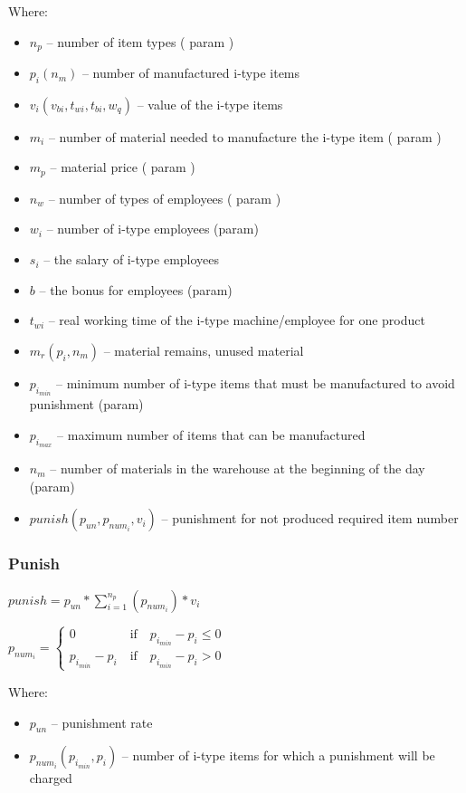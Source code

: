 \documentclass[a4paper]{article}
\begin{document}
Where:
\begin{itemize}
    \item $n_p$ -- number of item types ( param )
    \item $p_i (n_m)$ -- number of manufactured i-type items
    \item $v_i(v_{bi}, t_{wi},t_{bi},w_q)$ -- value of the i-type items
    \item $m_i$ -- number of material needed to manufacture the i-type item ( param )
    \item $m_p$ -- material price ( param )
    \item $n_w$ -- number of types of employees ( param )\item$w_i$ -- number of i-type employees (param)
    \item $s_i$ -- the salary of i-type employees\item$b$ -- the bonus for employees (param)
    \item $t_{wi}$ -- real working time of the i-type machine/employee for one product
    \item $m_r(p_i,n_m)$ -- material remains, unused material
    \item $p_{i_{min}}$ -- minimum number of i-type items that must be manufactured to avoid punishment (param) 
    \item $p_{i_{max}}$ -- maximum number of items that can be manufactured 
    \item $n_m$ -- number of materials in the warehouse at the beginning of the day (param)
    \item $punish(p_{un}, p_{num_i}, v_i)$ -- punishment for not produced required item number
\end{itemize}
\subsubsection{Punish}
$punish = p_{un}*\sum^{n_p}_{i=1}(p_{num_i})*v_i$

$p_{num_i}= \left\{\begin{matrix} 0  \;\quad\quad\quad\quad  \textrm{if} \quad  p_{i_{min}}-p_i \leq  0    \\ p_{i_{min}}-p_i  \quad  \textrm{if} \quad  p_{i_{min}}-p_i >  0  \end{matrix}\right.$

Where: 
\begin{itemize}
    \item $p_{un}$ -- punishment rate 
    \item $p_{num_i}(p_{i_{min}}, p_i)$ -- number of i-type items for which a punishment will be charged
\end{itemize}
\end{document}
